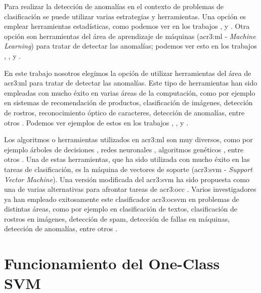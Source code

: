 Para realizar la detección de anomalías en el contexto de problemas de
clasificación se puede utilizar varias estrategias y herramientas.
Una opción es emplear herramientas estadísticas, como podemos ver en
los trabajos \citep{kruegel2003anomaly}, \citep{gimenez2015tfg} y
\citep{torranoGimenez2015study}.
Otra opción son herramientas del área de aprendizaje de máquinas
(\gls{acr3:ml} - \textit{Machine Learning}) para tratar de detectar
las anomalías; podemos ver esto en los trabajos \citep{sommer2010outside},
\citep{buczak2016survey}, \citep{parhizkar2015oc}
y \citep{torranoGimenez2015study}.

En este trabajo nosotros elegimos la opción de utilizar herramientas
del área de \gls{acr3:ml} para tratar de detectar las anomalías. Este
tipo de herramientas han sido empleadas con mucho éxito en varias áreas
de la computación, como por ejemplo en sistemas de recomendación de
productos, clasificación de imágenes, detección de rostros, reconocimiento
óptico de caracteres, detección de anomalías, entre otros
\citep{torranoGimenez2015study}. %
Podemos ver ejemplos de estos en los trabajos \citep{sommer2010outside},
\citep{buczak2016survey}, \citep{parhizkar2015oc} y
\citep{torranoGimenez2015study}.

Los algoritmos o herramientas utilizados en \gls{acr3:ml} son muy diversos,
como por ejemplo
árboles de decisiones \citep{torranoGimenez2015study}, %
redes neuronales \citep{corchado2011neural},
algoritmos genéticos \citep{abadeh2011design},
entre otros \citep{torranoGimenez2015study}. %
Una de estas herramientas, que ha sido utilizada con mucho éxito en las
tareas de clasificación, es la máquina de vectores de soporte
(\gls{acr3:svm} - \textit{Support Vector Machine}). Una versión modificada
del \gls{acr3:svm} ha sido propuesta como una de varias alternativas
para afrontar tareas de \gls{acr3:occ} \citep{scholkopf2001estimating}.
Varios investigadores ya han empleado exitosamente este clasificador
\gls{acr3:ocsvm} en problemas de distintas áreas, como por ejemplo en
clasificación de textos, clasificación de rostros en imágenes, detección
de spam, detección de fallas en máquinas, detección de anomalías, entre
otros \citep{khan2014one}. %


\section{Funcionamiento del One-Class SVM}


